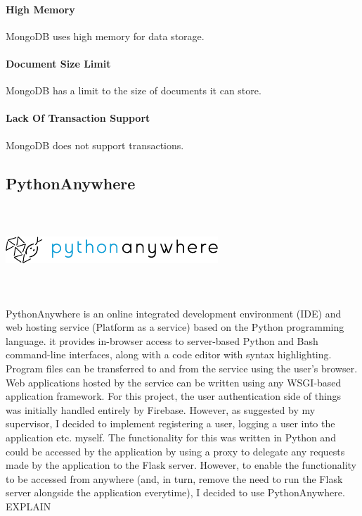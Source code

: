 \paragraph{High Memory}
MongoDB uses high memory for data storage.

\paragraph{Document Size Limit}
MongoDB has a limit to the size of documents it can store.

\paragraph{Lack Of Transaction Support}
MongoDB does not support transactions.
\par
\medskip
\par
\medskip

\subsection{PythonAnywhere}
\par
\medskip
\begin{center}
    \includegraphics[width=8cm,height=3.3cm,keepaspectratio]{images/pythonanywhere}
\end{center}
PythonAnywhere is an online integrated development environment (IDE) and web hosting service (Platform as a service) based on the Python programming language. it provides in-browser access to server-based Python and Bash command-line interfaces, along with a code editor with syntax highlighting. Program files can be transferred to and from the service using the user's browser. Web applications hosted by the service can be written using any WSGI-based application framework. For this project, the user authentication side of things was initially handled entirely by Firebase. However, as suggested by my supervisor, I decided to implement registering a user, logging a user into the application etc. myself. The functionality for this was written in Python and could be accessed by the application by using a proxy to delegate any requests made by the application to the Flask server. However, to enable the functionality to be accessed from anywhere (and, in turn, remove the need to run the Flask server alongside the application everytime), I decided to use PythonAnywhere. EXPLAIN

